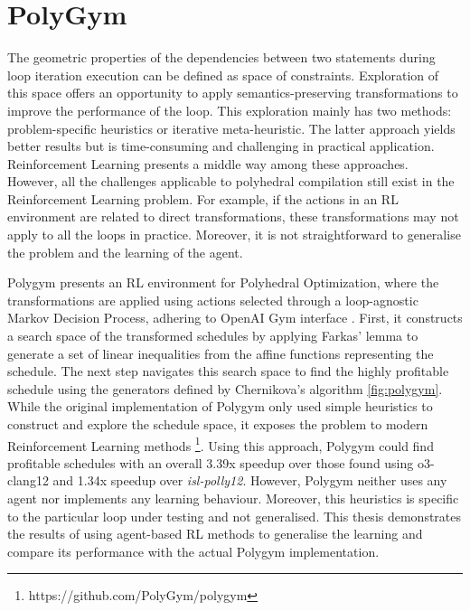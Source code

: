 \documentclass[logo,msc]{infthesis}           %
\begin{document}
\section{PolyGym}

The geometric properties of the dependencies between two statements during loop iteration execution can be defined as space of constraints. Exploration of this space offers an opportunity to apply semantics-preserving transformations to improve the performance of the loop. This exploration mainly has two methods: problem-specific heuristics \cite{isl} \cite{Bondhugula07pluto:a} or iterative meta-heuristic\cite{it_Single}\cite{it_multi}. The latter approach yields better results but is time-consuming and challenging in practical application. Reinforcement Learning presents a middle way among these approaches. However, all the challenges applicable to polyhedral compilation still exist in the Reinforcement Learning problem. For example, if the actions in an RL environment are related to direct transformations, these transformations may not apply to all the loops in practice. Moreover, it is not straightforward to generalise the problem and the learning of the agent.

Polygym presents an RL environment for Polyhedral Optimization\cite{PolyOpt}, where the transformations are applied using actions selected through a loop-agnostic Markov Decision Process, adhering to OpenAI Gym interface \cite{Gym}. First, it constructs a search space of the transformed schedules by applying Farkas' lemma \cite{schrijver1998theory} to generate a set of linear inequalities from the affine functions representing the schedule. The next step navigates this search space to find the highly profitable schedule using the generators defined by Chernikova's algorithm \ref{fig:polygym}. While the original implementation of Polygym only used simple heuristics to construct and explore the schedule space, it exposes the problem to modern Reinforcement Learning methods \footnote{https://github.com/PolyGym/polygym}. Using this approach, Polygym could find profitable schedules with an overall 3.39x speedup over those found using o3-clang12 and 1.34x speedup over \textit{isl-polly12}. However, Polygym neither uses any agent nor implements any learning behaviour. Moreover, this heuristics is specific to the particular loop under testing and not generalised. This thesis demonstrates the results of using agent-based RL methods to generalise the learning and compare its performance with the actual Polygym implementation.
\end{document}
